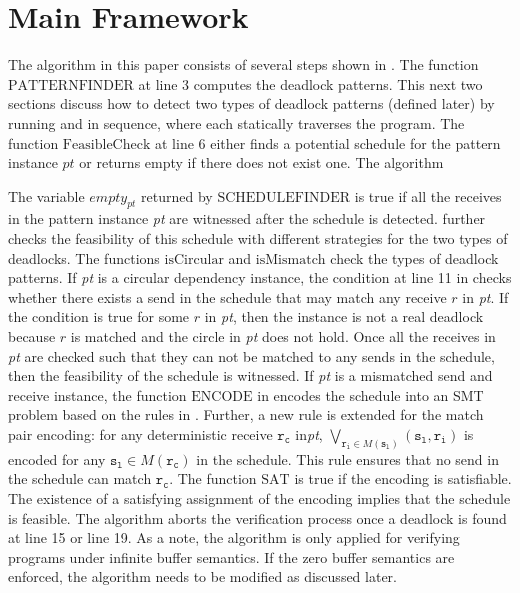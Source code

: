 \section{Main Framework}


\examplefigone

The algorithm in this paper consists of several steps shown in . The function $\mathrm{PATTERNFINDER}$ at line 3 computes the deadlock patterns. This next two sections discuss how to detect two types of deadlock patterns (defined later) by running  and  in sequence, where each statically traverses the program. The function $\mathrm{FeasibleCheck}$ at line 6 either finds a potential schedule for the pattern instance $\mathit{pt}$ or returns empty if there does not exist one. The algorithm  

The variable $\mathit{empty}_{pt}$ returned by $\mathrm{SCHEDULEFINDER}$ is true if all the receives in the pattern instance \textit{pt} are witnessed after the schedule is detected.  further checks the feasibility of this schedule with different strategies for the two types of deadlocks. The functions $\mathrm{isCircular}$ and $\mathrm{isMismatch}$ check the types of deadlock patterns. If \textit{pt} is a circular dependency instance, the condition at line 11 in  checks whether there exists a send in the schedule that may match any receive $\mathit{r}$ in \textit{pt}. If the condition is true for some $\mathit{r}$ in \textit{pt}, then the instance is not a real deadlock because $\mathit{r}$ is matched and the circle in \textit{pt} does not hold. Once all the receives in \textit{pt} are checked such that they can not be matched to any sends in the schedule, then the feasibility of the schedule is witnessed. If \textit{pt} is a mismatched send and receive instance, the function $\mathrm{ENCODE}$ in  encodes the schedule into an SMT problem based on the rules in \cite{DBLP:conf/kbse/HuangMM13}. Further, a new rule is extended for the match pair encoding: for any deterministic receive $\mathtt{r_c}$ in\textit{pt}, $\bigvee_{\mathtt{r_i}\in\mathit{M}(\mathtt{s_l})}(\mathtt{s_l},\mathtt{r_i})$ is encoded for any $\mathtt{s_l}\in\mathit{M}(\mathtt{r_c})$ in the schedule. This rule ensures that no send in the schedule can match $\mathtt{r_c}$. The function $\mathrm{SAT}$ is true if the encoding is satisfiable. The existence of a satisfying assignment of the encoding implies that the schedule is feasible. The algorithm aborts the verification process once a deadlock is found at line 15 or line 19. As a note, the algorithm is only applied for verifying programs under infinite buffer semantics. If the zero buffer semantics are enforced, the algorithm needs to be modified as discussed later.

